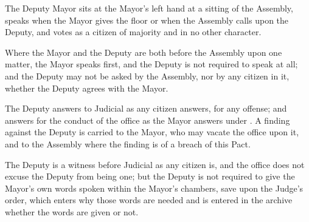 \begin{clauses}
\item The Deputy Mayor sits at the Mayor's left hand at a sitting of the Assembly, speaks when the Mayor gives the floor or when the Assembly calls upon the Deputy, and votes as a citizen of majority and in no other character.
\item Where the Mayor and the Deputy are both before the Assembly upon one matter, the Mayor speaks first, and the Deputy is not required to speak at all; and the Deputy may not be asked by the Assembly, nor by any citizen in it, whether the Deputy agrees with the Mayor.
\item The Deputy answers to Judicial as any citizen answers, for any offense; and answers for the conduct of the office as the Mayor answers under . A finding against the Deputy is carried to the Mayor, who may vacate the office upon it, and to the Assembly where the finding is of a breach of this Pact.
\item The Deputy is a witness before Judicial as any citizen is, and the office does not excuse the Deputy from being one; but the Deputy is not required to give the Mayor's own words spoken within the Mayor's chambers, save upon the Judge's order, which enters why those words are needed and is entered in the archive whether the words are given or not.
\end{clauses}
